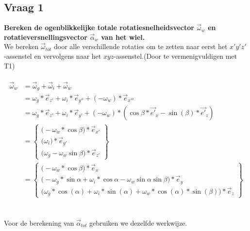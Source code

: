 \documentclass[a4paper,10pt]{article}
\begin{document}
\subsection{Vraag 1}
\textbf{Bereken de ogenblikkelijke totale rotatiesnelheidsvector $\vec{\omega}_{w}$ en rotatieversnellingsvector $\vec{\alpha}_{w}$ van het wiel.}\\
We bereken $\vec{\omega}_{tot}$ door alle verschillende rotaties om te zetten naar eerst het $x'y'z'$-assenstel en vervolgens naar het $xyz$-assenstel.(Door te vermenigvuldigen met T1)\\
\\
\begin{equation} 
\begin{aligned}
	\vec{\omega}_{w} &= \vec{\omega}_{g} + \vec{\omega}_{i} + \vec{\omega}_{w} \\
	& = {\omega}_g * \vec{e}_{z'} + {\omega}_i * \vec{e}_{y''} +(-{\omega}_w)*\vec{e}_{x'''}\\
	& =  {\omega}_g * \vec{e}_{z'} + {\omega}_i * \vec{e}_{y'} +(-{\omega}_w)*(\cos{\beta}*\vec{e'}_{x}-\sin(\beta)*\vec{e'}_{z})\\
	&=\begin{Bmatrix}
	\Big(-\omega_w*\cos{\beta}\Big)*\vec{e}_{x'} \\
	\Big(\omega_i\Big)*\vec{e}_{y'}\\
	\Big(\omega_g-\omega_w \sin{\beta}\Big)*\vec{e}_{z'}
	\end{Bmatrix}\\
	& = \begin{Bmatrix}
	\Big(- {\omega}_{w} * \cos{\beta}\Big)*\vec{e}_x \\
	\Big(- {\omega}_{g} * \sin{\alpha} + {\omega}_{i} * \cos{\alpha} - {\omega}_{w} \sin{\alpha} \sin{\beta} \Big) *\vec{e}_y \\
	\Big({\omega}_{g} * \cos(\alpha) + {\omega}_{i} * \sin(\alpha) + {\omega}_{w} * \cos(\alpha)*\sin(\beta)\Big) *\vec{e}_z
	\end{Bmatrix} 
\end{aligned}
\end{equation}\\
\\
Voor de berekening van $\vec{\alpha}_{tot}$ gebruiken we dezelfde werkwijze.\\
\\
\end{document}
